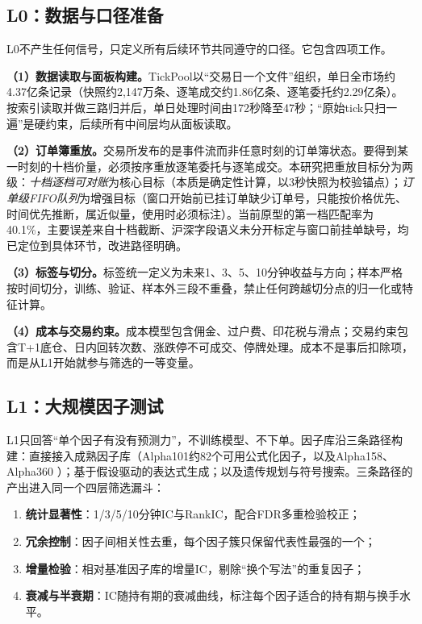 \documentclass[11pt,a4paper]{article}
\begin{document}
\subsection*{L0：数据与口径准备}

L0不产生任何信号，只定义所有后续环节共同遵守的口径。它包含四项工作。

\textbf{（1）数据读取与面板构建。}TickPool以``交易日一个文件''组织，单日全市场约4.37亿条记录（快照约2{,}147万条、逐笔成交约1.86亿条、逐笔委托约2.29亿条）。按索引读取并做三路归并后，单日处理时间由172秒降至47秒；``原始tick只扫一遍''是硬约束，后续所有中间层均从面板读取。

\textbf{（2）订单簿重放。}交易所发布的是事件流而非任意时刻的订单簿状态。要得到某一时刻的十档价量，必须按序重放逐笔委托与逐笔成交。本研究把重放目标分为两级：\emph{十档逐档可对账}为核心目标（本质是确定性计算，以3秒快照为校验锚点）；\emph{订单级FIFO队列}为增强目标（窗口开始前已挂订单缺少订单号，只能按价格优先、时间优先推断，属近似量，使用时必须标注）。当前原型的第一档匹配率为40.1\%，主要误差来自十档截断、沪深字段语义未分开标定与窗口前挂单缺号，均已定位到具体环节，改进路径明确。

\textbf{（3）标签与切分。}标签统一定义为未来1、3、5、10分钟收益与方向；样本严格按时间切分，训练、验证、样本外三段不重叠，禁止任何跨越切分点的归一化或特征计算。

\textbf{（4）成本与交易约束。}成本模型包含佣金、过户费、印花税与滑点；交易约束包含T+1底仓、日内回转次数、涨跌停不可成交、停牌处理。成本不是事后扣除项，而是从L1开始就参与筛选的一等变量。

\subsection*{L1：大规模因子测试}

L1只回答``单个因子有没有预测力''，不训练模型、不下单。因子库沿三条路径构建：直接接入成熟因子库（Alpha101约82个可用公式化因子\citep{kakushadze2016101}，以及Alpha158、Alpha360 \citep{yang2020qlib}）；基于假设驱动的表达式生成；以及遗传规划与符号搜索。三条路径的产出进入同一个四层筛选漏斗：

\begin{enumerate}
  \item \textbf{统计显著性}：1/3/5/10分钟IC与RankIC，配合FDR多重检验校正\citep{harvey2016}；
  \item \textbf{冗余控制}：因子间相关性去重，每个因子簇只保留代表性最强的一个；
  \item \textbf{增量检验}：相对基准因子库的增量IC，剔除``换个写法''的重复因子；
  \item \textbf{衰减与半衰期}：IC随持有期的衰减曲线，标注每个因子适合的持有期与换手水平。
\end{enumerate}
\end{document}
